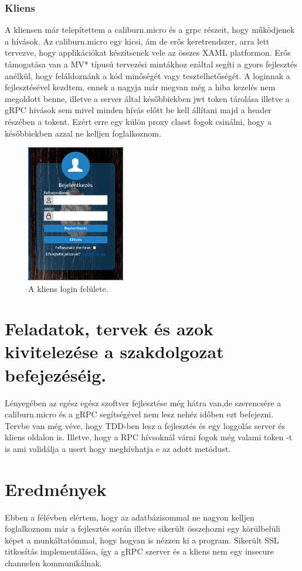\documentclass[conference]{IEEEtran}
\begin{document}
\subsubsection{Kliens}
A kliensen már telepítettem a caliburn.micro és a grpc részeit, hogy működjenek a hívások. Az caliburn.micro egy kicsi, ám de erős keretrendszer, arra lett tervezve, hogy applikációkat készítsenek vele az összes XAML platformon. Erős támogatása van a MV* típusú tervezési mintákhoz ezáltal segíti a gyors fejlesztés anélkül, hogy feláldoznánk a kód minőségét vagy tesztelhetőségét.\cite{b5} A loginnak a fejlesztésével kezdtem, ennek a nagyja már megvan még a hiba kezelés nem megoldott benne, illetve a server által későbbiekben jwt token tárolása illetve a gRPC hivások sem mivel minden hívás előtt be kell állítani majd a header részében a tokent. Ezért erre egy külön proxy classt fogok csinálni, hogy a későbbiekben azzal ne kelljen foglalkoznom.
\begin{figure}[hp!]
	\centerline {\includegraphics[height=6cm,keepaspectratio]{login.png}}
	\caption{A kliens login felülete.}
	\label{fig2}
\end{figure}

\section*{Feladatok, tervek és azok kivitelezése a szakdolgozat befejezéséig.}
Lényegében az egész egész szoftver fejlesztése még hátra van,de szerencsére a caliburn.micro és a gRPC segítségével nem lesz nehéz időben ezt befejezni. Tervbe van még véve, hogy TDD-ben lesz a fejlesztés és egy loggolás server és kliens oldalon is. Illetve, hogy a RPC hívsoknál várni fogok még valami token -t is ami validálja a usert hogy meghívhatja e az adott metódust.


\section*{Eredmények}
Ebben a félévben elértem, hogy az adatbázisommal ne nagyon kelljen foglalkoznom már a fejlesztés során illetve sikerült összehozni egy körülbelüli képet a munkáltatómmal, hogy hogyan is nézzen ki a program. Sikerült SSL titkosítás implementálása, így a gRPC szerver és a kliens nem egy insecure channelen kommunikálnak.
\end{document}
